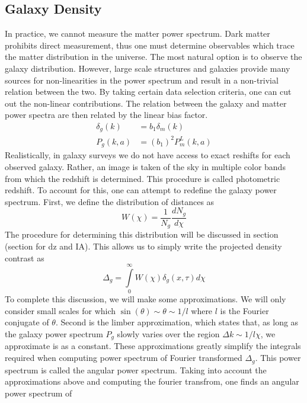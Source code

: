\subsection{Galaxy Density}
In practice, we cannot measure the matter power spectrum. Dark matter prohibits direct measurement, thus one must determine observables which trace the matter distribution in the universe. The most natural option is to observe the galaxy distribution. However, large scale structures and galaxies provide many sources for non-linearities in the power spectrum and result in a non-trivial relation between the two. By taking certain data selection criteria, one can cut out the non-linear contributions. The relation between the galaxy and matter power spectra are then related by the linear bias factor.
\begin{equation}
	\begin{split}
		\delta_g(k) &= b_1 \delta_m(k) \\
		P_g(k,a) &= (b_1)^2P_m^L(k,a)
	\end{split}
\end{equation}
Realistically, in galaxy surveys we do not have access to exact reshifts for each observed galaxy. Rather, an image is taken of the sky in multiple color bands from which the redshift is determined. This procedure is called photometric redshift. To account for this, one can attempt to redefine the galaxy power spectrum. First, we define the distribution of distances as
\begin{equation}
	W(\chi) = \frac{1}{N_g}\frac{dN_g}{d\chi}
\end{equation}
The procedure for determining this distribution will be discussed in section (section for dz and IA). This allows us to simply write the projected density contrast as
\begin{equation}
	\Delta_g = \int\limits_0^\infty W(\chi)\delta_g(x,\tau)d\chi
\end{equation}
To complete this discussion, we will make some approximations. We will only consider small scales for which $\sin(\theta)\sim \theta \sim 1/l$ where $l$ is the Fourier conjugate of $\theta$. Second is the limber approximation, which states that, as long as the galaxy power spectrum $P_g$ slowly varies over the region $\Delta k \sim 1/l\chi$, we approximate is as a constant. These approximations greatly simplify the integrals required when computing power spectrum of Fourier transformed $\Delta_g$. This power spectrum is called the angular power spectrum. Taking into account the approximations above and computing the fourier transfrom, one finds an angular power spectrum of
